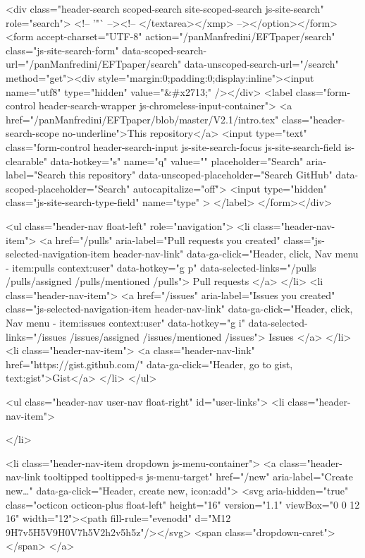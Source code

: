         <div class="header-search scoped-search site-scoped-search js-site-search" role="search">
  <!-- '"` --><!-- </textarea></xmp> --></option></form><form accept-charset="UTF-8" action="/panManfredini/EFTpaper/search" class="js-site-search-form" data-scoped-search-url="/panManfredini/EFTpaper/search" data-unscoped-search-url="/search" method="get"><div style="margin:0;padding:0;display:inline"><input name="utf8" type="hidden" value="&#x2713;" /></div>
    <label class="form-control header-search-wrapper js-chromeless-input-container">
        <a href="/panManfredini/EFTpaper/blob/master/V2.1/intro.tex" class="header-search-scope no-underline">This repository</a>
      <input type="text"
        class="form-control header-search-input js-site-search-focus js-site-search-field is-clearable"
        data-hotkey="s"
        name="q"
        value=""
        placeholder="Search"
        aria-label="Search this repository"
        data-unscoped-placeholder="Search GitHub"
        data-scoped-placeholder="Search"
        autocapitalize="off">
        <input type="hidden" class="js-site-search-type-field" name="type" >
    </label>
</form></div>


      <ul class="header-nav float-left" role="navigation">
        <li class="header-nav-item">
          <a href="/pulls" aria-label="Pull requests you created" class="js-selected-navigation-item header-nav-link" data-ga-click="Header, click, Nav menu - item:pulls context:user" data-hotkey="g p" data-selected-links="/pulls /pulls/assigned /pulls/mentioned /pulls">
            Pull requests
</a>        </li>
        <li class="header-nav-item">
          <a href="/issues" aria-label="Issues you created" class="js-selected-navigation-item header-nav-link" data-ga-click="Header, click, Nav menu - item:issues context:user" data-hotkey="g i" data-selected-links="/issues /issues/assigned /issues/mentioned /issues">
            Issues
</a>        </li>
          <li class="header-nav-item">
            <a class="header-nav-link" href="https://gist.github.com/" data-ga-click="Header, go to gist, text:gist">Gist</a>
          </li>
      </ul>

    
<ul class="header-nav user-nav float-right" id="user-links">
  <li class="header-nav-item">
    

  </li>

  <li class="header-nav-item dropdown js-menu-container">
    <a class="header-nav-link tooltipped tooltipped-s js-menu-target" href="/new"
       aria-label="Create new…"
       data-ga-click="Header, create new, icon:add">
      <svg aria-hidden="true" class="octicon octicon-plus float-left" height="16" version="1.1" viewBox="0 0 12 16" width="12"><path fill-rule="evenodd" d="M12 9H7v5H5V9H0V7h5V2h2v5h5z"/></svg>
      <span class="dropdown-caret"></span>
    </a>

